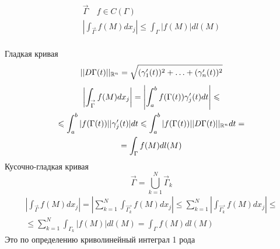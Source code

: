 \documentclass[main]{subfiles}
\begin{document}
\begin{theorem}
    \begin{gather*}
        \stackrel{\rightarrow}{\Gamma} \quad f \in C(\Gamma) \\
        \left| \int_{\stackrel{\rightarrow}{\Gamma}} f(M) dx_j \right| \leq \int_\Gamma |f(M)|dl(M) \\
    \end{gather*}
\end{theorem}
\begin{longProof}
    Гладкая кривая
    \begin{gather*}
        ||D\Gamma(t)||_{{\mathbb{R}^n}} = \sqrt{(\gamma_1^\prime(t))^2 + \ldots + (\gamma^\prime_n(t))^2} 
    \end{gather*}
    \begin{multline*}
        \left| \int_{\stackrel{\rightarrow}{\Gamma}} f(M) dx_j \right| = \left| \int^b_a f(\Gamma(t))\gamma^\prime_j(t) dt \right| \leqslant\\
        \leqslant \int^b_a | f(\Gamma(t)) | | \gamma^\prime_j(t)| dt \leqslant \int^b_a |f(\Gamma(t))||D\Gamma(t)||_{\mathbb{R}^n} dt = \\
        = \int_{\Gamma} f(M) dl(M) 
    \end{multline*}
    Кусочно-гладкая кривая
    \[\stackrel{\rightarrow}{\Gamma} = \bigcup^N_{k=1} \stackrel{\rightarrow}{\Gamma}_k \] 
    \begin{multline*}
        \left| \int_{\stackrel{\rightarrow}{\Gamma}} f(M) dx_j \right| = \left| \sum^N_{k=1}
         \int_{\stackrel{\rightarrow}{\Gamma_k}} f(M)dx_j \right| \leq \sum^N_{k=1} 
         \left| \int_{\stackrel{\rightarrow}{\Gamma_k}} f(M)dx_j \right| \leq \\
         \leq \sum^N_{k=1}  \int_{\Gamma_k} |f(M)|dl(M) = \int_{\Gamma} f(M)dl(M)
    \end{multline*}
    Это по определению криволинейный интеграл 1 рода
\end{longProof}
\end{document}
